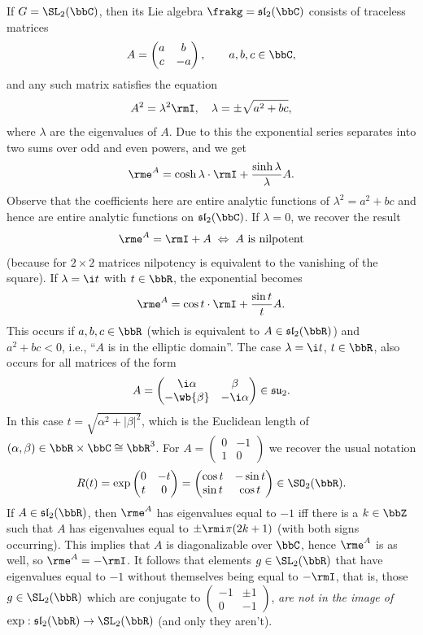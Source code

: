 \begin{example}
If $G=\SL_2(\bbC)$, then its Lie algebra $\frakg=\mathfrak{sl}_2(\bbC)$ consists of traceless matrices
\[A=\begin{pmatrix}
    a&b\\c&-a
\end{pmatrix},\quad \quad a,b,c\in\bbC,\]
and any such matrix satisfies the equation
\[A^2=\lambda^2 \rmI,\quad \lambda=\pm \sqrt{a^2+bc},\]
where $\lambda$ are the eigenvalues of $A$. Due to this the exponential series separates into two sums over odd and even powers, and we get
\[\rme^A=\cosh \lambda \cdot \rmI+\frac{\sinh \lambda}{\lambda}A.\]
Observe that the coefficients here are entire analytic functions of $\lambda^2=a^2+bc$ and hence are entire analytic functions on $\mathfrak{sl}_2(\bbC)$. If $\lambda=0$, we recover the result
\[\rme^A=\rmI+A \; \Leftrightarrow \; A\text{ is nilpotent}\]
(because for $2\times 2$ matrices nilpotency is equivalent to the vanishing of the square). If $\lambda=\i t$ with $t\in \bbR$, the exponential becomes
\[\rme^A=\cos t\cdot \rmI+\frac{\sin t}{t}A.\]
This occurs if $a,b,c\in\bbR$ (which is equivalent to $A\in\mathfrak{sl}_2(\bbR)$) and $a^2+bc<0$, i.e., ``$A$ is in the elliptic domain''. The case $\lambda=\i t$, $t\in\bbR$, also occurs for all matrices of the form
\[A=\begin{pmatrix}
    \i\alpha&\beta\\-\wb{\beta}&-\i\alpha
\end{pmatrix}\in\mathfrak{su}_2.\]
In this case $t=\sqrt{\alpha^2+|\beta|^2}$, which is the Euclidean length of $(\alpha,\beta)\in\bbR\times\bbC\cong \bbR^3$. For $A=\begin{pmatrix}
    0&-1\\1&0
\end{pmatrix}$ we recover the usual notation
\[R(t)=\exp \begin{pmatrix}
    0&-t\\t&0
\end{pmatrix}=\begin{pmatrix}
    \cos t&-\sin t\\\sin t&\cos t
\end{pmatrix}\in\SO_2(\bbR).\]
If $A\in\mathfrak{sl}_2(\bbR)$, then $\rme^A$ has eigenvalues equal to $-1$ iff there is a $k\in\bbZ$ such that $A$ has eigenvalues equal to $\pm\rmi \pi(2k+1)$ (with both signs occurring). This implies that $A$ is diagonalizable over $\bbC$, hence $\rme^A$ is as well, so $\rme^A=-\rmI$. It follows that elements $g\in\SL_2(\bbR)$ that have eigenvalues equal to $-1$ without themselves being equal to $-\rmI$, that is, those $g\in\SL_2(\bbR)$ which are conjugate to $\left(\begin{smallmatrix}
    -1&\pm 1\\0&-1
\end{smallmatrix}\right)$, \emph{are not in the image of $\exp:\mathfrak{sl}_2(\bbR)\to \SL_2(\bbR)$} (and only they aren't).


\end{example}
